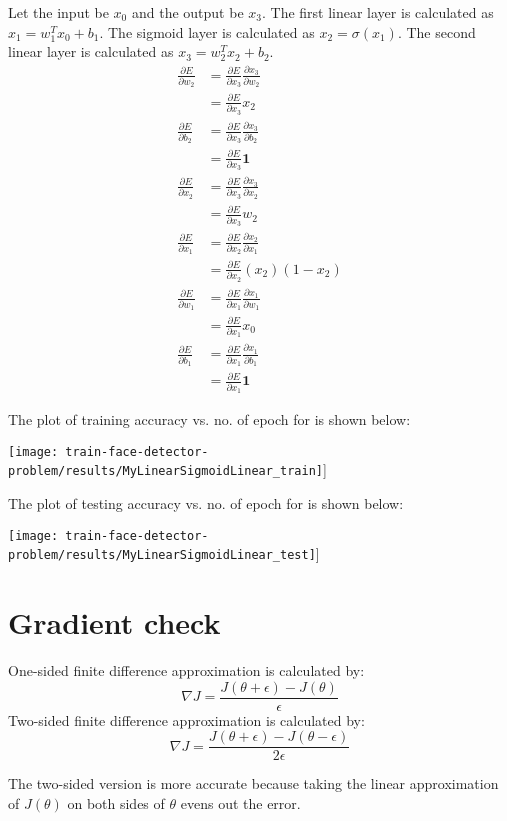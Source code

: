 \documentclass[twoside,12pt]{article}
\newcommand{\imsize}{0.5\linewidth}
\begin{document}
Let the input be $x_0$ and the output be $x_3$. The first linear layer is calculated as $x_1=w_1^Tx_0+b_1$.
The sigmoid layer is calculated as $x_2=\sigma(x_1)$.
The second linear layer is calculated as $x_3=w_2^Tx_2+b_2$.
\begin{equation}
\begin{split}
\frac{\partial E}{\partial w_2} &= \frac{\partial E}{\partial x_3} \frac{\partial x_3}{\partial w_2} \\
							    &= \frac{\partial E}{\partial x_3} x_2 \\
\frac{\partial E}{\partial b_2} &= \frac{\partial E}{\partial x_3} \frac{\partial x_3}{\partial b_2} \\
							    &= \frac{\partial E}{\partial x_3} \mathbf{1} \\
\frac{\partial E}{\partial x_2} &= \frac{\partial E}{\partial x_3} \frac{\partial x_3}{\partial x_2} \\
								&= \frac{\partial E}{\partial x_3} w_2 \\
\frac{\partial E}{\partial x_1} &= \frac{\partial E}{\partial x_2} \frac{\partial x_2}{\partial x_1} \\
							    &= \frac{\partial E}{\partial x_2} (x_2) (1-x_2) \\
\frac{\partial E}{\partial w_1} &= \frac{\partial E}{\partial x_1} \frac{\partial x_1}{\partial w_1} \\
							    &= \frac{\partial E}{\partial x_1} x_0 \\
\frac{\partial E}{\partial b_1} &= \frac{\partial E}{\partial x_1} \frac{\partial x_1}{\partial b_1} \\
							    &= \frac{\partial E}{\partial x_1} \mathbf{1} 
\end{split}
\end{equation}

The plot of training accuracy vs. no. of epoch for is shown below:

\texttt{[image: train-face-detector-problem/results/MyLinearSigmoidLinear\_train]}]

The plot of testing accuracy vs. no. of epoch for is shown below:

\texttt{[image: train-face-detector-problem/results/MyLinearSigmoidLinear\_test]}]

\section{Gradient check}

One-sided finite difference approximation is calculated by:
\begin{equation}
\nabla J = \frac{J(\theta + \epsilon) - J(\theta)}{\epsilon}
\end{equation}
Two-sided finite difference approximation is calculated by:
\begin{equation}
\nabla J = \frac{J(\theta + \epsilon) - J(\theta - \epsilon)}{2 \epsilon}
\end{equation}

The two-sided version is more accurate because taking the linear approximation of $J(\theta)$
on both sides of $\theta$ evens out the error.
\end{document}

